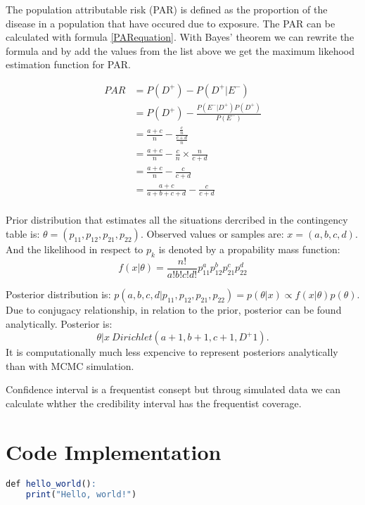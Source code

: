 The population attributable risk (PAR) is defined as the proportion of the disease in a population that have occured due to exposure. The PAR can be calculated with formula \ref{PARequation}. With Bayes' theorem we can rewrite the formula and by add the values from the list above we get the maximum likehood estimation function for PAR.

\begin{equation}
\begin{split}
PAR &= P(D^+) - P(D^+| E^-) \\
    &= P(D^+) - \frac{P(E^-|D^+)P(D^+)}{P(E^-)} \\
    &= \frac{a + c}{n} - \frac{\frac{c}{n}}{\frac{c + d}{n}} \\
    &= \frac{a + c}{n} - \frac{c}{n} \times  \frac{n}{c + d} \\
    &= \frac{a + c}{n} - \frac{c}{c + d} \\
    &= \frac{a + c}{a + b + c + d} - \frac{c}{c + d} \\
\end{split}
\end{equation}

Prior distribution that estimates all the situations dercribed in the contingency table is: 
$\theta = (p_{11}, p_{12}, p_{21}, p_{22})$. Observed values or samples are: $x = (a, b, c, d)$. And the likelihood in respect to $p_k$ is denoted by a propability mass function: 
\begin{equation}
    f(x|\theta) = \frac{n!}{a!b!c!d!}p_{11}^ap_{12}^bp_{21}^cp_{22}^d
\end{equation}

Posterior distribution is: $p(a,b,c,d|p_{11}, p_{12},p_{21},p_{22}) = p(\theta|x) \varpropto  f (x|\theta)p(\theta)$. Due to conjugacy relationship, in relation to the prior, posterior can be found analytically. Posterior is:
\begin{equation}
    \theta|x ~ Dirichlet(a + 1, b + 1, c + 1, D^+ 1).
\end{equation}
It is computationally much less expencive to represent posteriors analytically than with MCMC simulation. \cite{Pirikahu2016BayesianMO}

Confidence interval is a frequentist consept but throug simulated data we can calculate whther the credibility interval has the frequentist coverage.

\section{Code Implementation} \label{CodeImplementation}
\begin{lstlisting}[language=R]
def hello_world():
    print("Hello, world!")
\end{lstlisting}